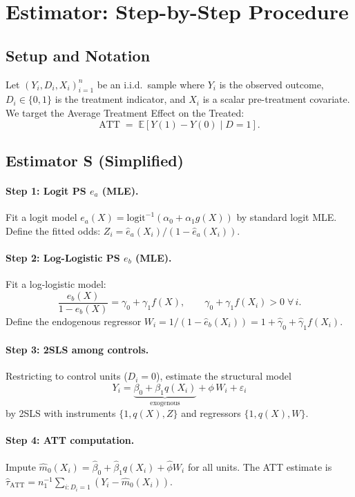 \documentclass[11pt,letterpaper]{article}
\newcommand{\E}{\mathbb{E}}
\newcommand{\logit}{\mathrm{logit}}
\newcommand{\ATT}{\mathrm{ATT}}
\begin{document}
\section{Estimator: Step-by-Step Procedure}

\subsection{Setup and Notation}

Let $(Y_i, D_i, X_i)_{i=1}^n$ be an i.i.d.\ sample where $Y_i$ is
the observed outcome, $D_i \in \{0,1\}$ is the treatment indicator,
and $X_i$ is a scalar pre-treatment covariate.  We target the Average
Treatment Effect on the Treated:
\[
  \ATT \;=\; \E[Y(1) - Y(0) \mid D = 1].
\]

\subsection{Estimator S (Simplified)}

\paragraph{Step 1: Logit PS $e_a$ (MLE).}
Fit a logit model $e_a(X) = \logit^{-1}(\alpha_0 + \alpha_1 g(X))$
by standard logit MLE.  Define the fitted odds:
$Z_i = \hat{e}_a(X_i)/(1 - \hat{e}_a(X_i))$.

\paragraph{Step 2: Log-Logistic PS $e_b$ (MLE).}
Fit a log-logistic model:
\[
  \frac{e_b(X)}{1 - e_b(X)} = \gamma_0 + \gamma_1 f(X),
  \qquad \gamma_0 + \gamma_1 f(X_i) > 0 \;\forall\, i.
\]
Define the endogenous regressor $W_i = 1/(1 - \hat{e}_b(X_i)) = 1 + \hat\gamma_0 + \hat\gamma_1 f(X_i)$.

\paragraph{Step 3: 2SLS among controls.}
Restricting to control units ($D_i = 0$), estimate the structural model
\[
  Y_i = \underbrace{\beta_0 + \beta_1 q(X_i)}_{\text{exogenous}} + \phi\, W_i + \varepsilon_i
\]
by 2SLS with instruments $\{1, q(X), Z\}$ and regressors $\{1, q(X), W\}$.

\paragraph{Step 4: ATT computation.}
Impute $\hat{m}_0(X_i) = \hat\beta_0 + \hat\beta_1 q(X_i) + \hat\phi W_i$
for all units.  The ATT estimate is
$\hat\tau_{\ATT} = n_1^{-1}\sum_{i:D_i=1}(Y_i - \hat{m}_0(X_i))$.
\end{document}
